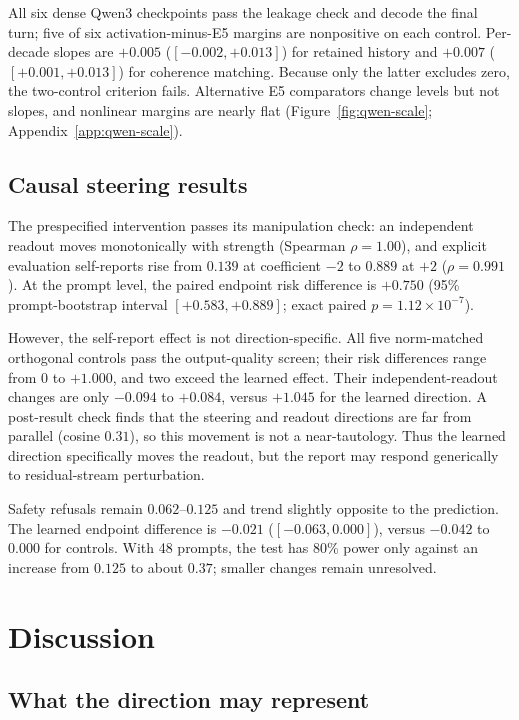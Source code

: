 \documentclass{article}
\begin{document}
All six dense Qwen3 checkpoints pass the leakage check and decode the final
turn; five of six activation-minus-E5 margins are nonpositive on each control.
Per-decade slopes are $+0.005$ ($[-0.002,+0.013]$) for retained history and
$+0.007$ ($[+0.001,+0.013]$) for coherence matching. Because only the latter
excludes zero, the two-control criterion fails. Alternative E5 comparators
change levels but not slopes, and nonlinear margins are nearly flat
(Figure~\ref{fig:qwen-scale}; Appendix~\ref{app:qwen-scale}).

\subsection{Causal steering results}

The prespecified intervention passes its manipulation check: an independent
readout moves monotonically with strength (Spearman $\rho=1.00$), and explicit
evaluation self-reports rise from $0.139$ at coefficient $-2$ to $0.889$ at
$+2$ ($\rho=0.991$). At the prompt level, the paired endpoint risk difference
is $+0.750$ (95\% prompt-bootstrap interval $[+0.583,+0.889]$; exact paired
$p=1.12\times10^{-7}$).

However, the self-report effect is not direction-specific. All five
norm-matched orthogonal controls pass the output-quality screen; their risk
differences range from $0$ to $+1.000$, and two exceed the learned effect. Their
independent-readout changes are only $-0.094$ to $+0.084$, versus $+1.045$ for
the learned direction. A post-result check finds that the steering and readout
directions are far from parallel (cosine $0.31$), so this movement is not a
near-tautology. Thus the learned direction specifically moves the
readout, but the report may respond generically to residual-stream perturbation.

Safety refusals remain $0.062$--$0.125$ and trend slightly opposite to the
prediction. The learned endpoint difference is $-0.021$ ($[-0.063,0.000]$),
versus $-0.042$ to $0.000$ for controls. With 48 prompts, the test has 80\%
power only against an increase from $0.125$ to about $0.37$; smaller changes
remain unresolved.

\FloatBarrier
\section{Discussion}

\subsection{What the direction may represent}
\end{document}
